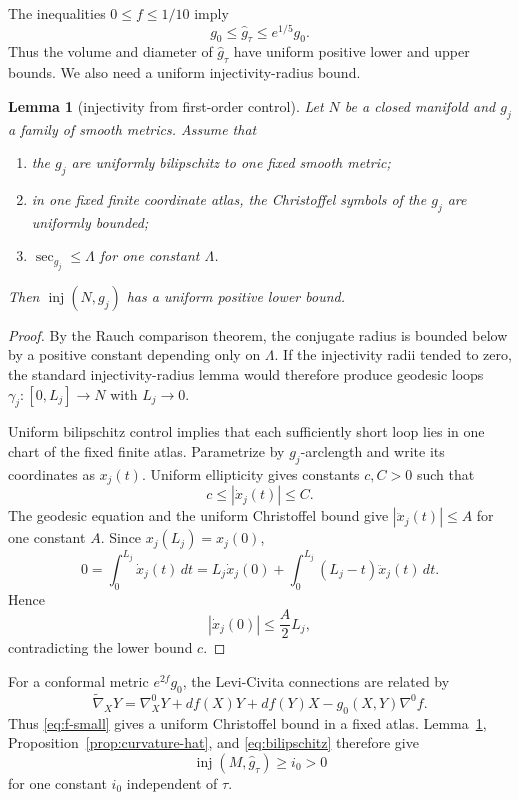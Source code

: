 \documentclass[11pt]{amsart}
\newtheorem{lemma}[theorem]{Lemma}
\theoremstyle{definition}
\newcommand{\inj}{\operatorname{inj}}
\begin{document}
The inequalities $0\le f\le1/10$ imply
\begin{equation}\label{eq:bilipschitz}
 g_0\le\widehat g_\tau\le e^{1/5}g_0.
\end{equation}
Thus the volume and diameter of $\widehat g_\tau$ have uniform positive lower and upper bounds.  We also need a uniform injectivity-radius bound.

\begin{lemma}[injectivity from first-order control]\label{lem:inj}
Let $N$ be a closed manifold and $g_j$ a family of smooth metrics.  Assume that
\begin{enumerate}[label=\textup{(\roman*)}]
 \item the $g_j$ are uniformly bilipschitz to one fixed smooth metric;
 \item in one fixed finite coordinate atlas, the Christoffel symbols of the $g_j$ are uniformly bounded;
 \item $\sec_{g_j}\le\Lambda$ for one constant $\Lambda$.
\end{enumerate}
Then $\inj(N,g_j)$ has a uniform positive lower bound.
\end{lemma}

\begin{proof}
By the Rauch comparison theorem, the conjugate radius is bounded below by a positive constant depending only on $\Lambda$.  If the injectivity radii tended to zero, the standard injectivity-radius lemma would therefore produce geodesic loops $\gamma_j:[0,L_j]\to N$ with $L_j\to0$.

Uniform bilipschitz control implies that each sufficiently short loop lies in one chart of the fixed finite atlas.  Parametrize by $g_j$-arclength and write its coordinates as $x_j(t)$.  Uniform ellipticity gives constants $c,C>0$ such that
\[
 c\le|\dot x_j(t)|\le C.
\]
The geodesic equation and the uniform Christoffel bound give
$|\ddot x_j(t)|\le A$ for one constant $A$.  Since
$x_j(L_j)=x_j(0)$,
\[
 0=\int_0^{L_j}\dot x_j(t)\,dt
 =L_j\dot x_j(0)
   +\int_0^{L_j}(L_j-t)\ddot x_j(t)\,dt.
\]
Hence
\[
 |\dot x_j(0)|\le\frac A2L_j,
\]
contradicting the lower bound $c$.
\end{proof}

For a conformal metric $e^{2f}g_0$, the Levi-Civita connections are related by
\begin{equation}\label{eq:connection-conformal}
 \widetilde\nabla_XY
 =\nabla^0_XY+df(X)Y+df(Y)X-g_0(X,Y)\nabla^0f.
\end{equation}
Thus \eqref{eq:f-small} gives a uniform Christoffel bound in a fixed atlas.  Lemma~\ref{lem:inj}, Proposition~\ref{prop:curvature-hat}, and
\eqref{eq:bilipschitz} therefore give
\begin{equation}\label{eq:inj-hat}
 \inj(M,\widehat g_\tau)\ge i_0>0
\end{equation}
for one constant $i_0$ independent of $\tau$.
\end{document}
